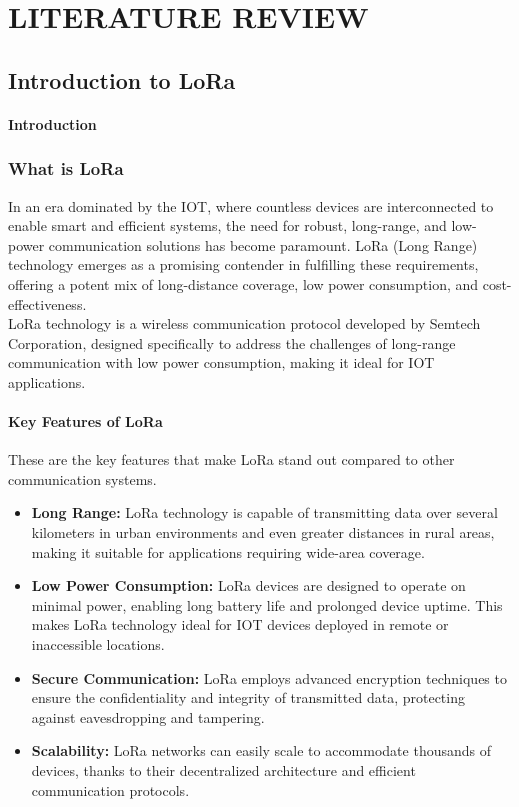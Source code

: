 \chapter{LITERATURE REVIEW}

\section{Introduction to LoRa}
\label{sec:LoRa}
\subsubsection{Introduction}

\subsection{What is LoRa}
\label{sec:LoRa}

\hspace{12pt} In an era dominated by the \ac{IOT}, where countless devices are interconnected to enable smart and efficient systems, the need for robust, long-range, and low-power communication solutions has become paramount. LoRa (Long Range) technology emerges as a promising contender in fulfilling these requirements, offering a potent mix of long-distance coverage, low power consumption, and cost-effectiveness.\\

LoRa technology is a wireless communication protocol developed by Semtech Corporation, designed specifically to address the challenges of long-range communication with low power consumption, making it ideal for \ac{IOT} applications.

\subsubsection{Key Features of LoRa}
These are the key features that make LoRa stand out compared to other communication systems.

\begin{itemize}
    \item \textbf{Long Range:} LoRa technology is capable of transmitting data over several kilometers in urban environments and even greater distances in rural areas, making it suitable for applications requiring wide-area coverage.
    
    \item \textbf{Low Power Consumption:} LoRa devices are designed to operate on minimal power, enabling long battery life and prolonged device uptime. This makes LoRa technology ideal for \ac{IOT} devices deployed in remote or inaccessible locations.

    \item \textbf{Secure Communication:} LoRa employs advanced encryption techniques to ensure the confidentiality and integrity of transmitted data, protecting against eavesdropping and tampering.

    \item \textbf{Scalability:} LoRa networks can easily scale to accommodate thousands of devices, thanks to their decentralized architecture and efficient communication protocols.
\end{itemize}

